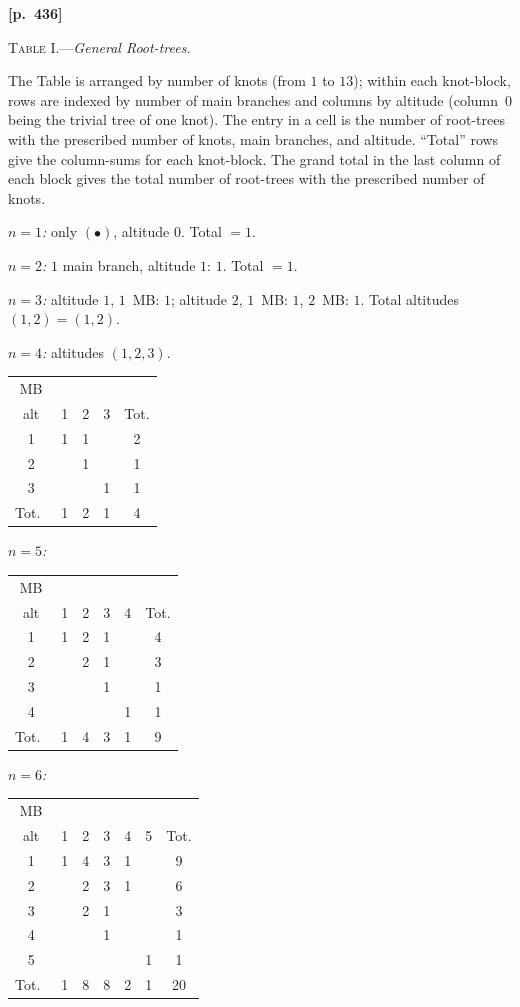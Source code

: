 \documentclass[11pt,a4paper]{article}
\begin{document}
\bigskip
\noindent\textbf{[p.~436]}\quad
\begin{center}
\textsc{Table I.}\quad---\quad\textit{General Root-trees.}
\end{center}

\noindent The Table is arranged by number of knots (from $1$ to $13$); within each knot-block, rows are indexed by number of main branches and columns by altitude (column~$0$ being the trivial tree of one knot). The entry in a cell is the number of root-trees with the prescribed number of knots, main branches, and altitude. ``Total'' rows give the column-sums for each knot-block. The grand total in the last column of each block gives the total number of root-trees with the prescribed number of knots.

\medskip

\noindent\textit{$n=1$:} only $(\bullet)$, altitude $0$. Total $=1$.

\smallskip
\noindent\textit{$n=2$:} $1$ main branch, altitude $1$: $1$. Total $=1$.

\smallskip
\noindent\textit{$n=3$:} altitude $1$, $1$~MB: $1$; altitude $2$, $1$~MB: $1$, $2$~MB: $1$. Total altitudes $(1,2)=(1,2)$.

\smallskip
\noindent\textit{$n=4$:} altitudes $(1,2,3)$.
\begin{center}
\begin{tabular}{c|ccc|c}
MB \\ alt & 1 & 2 & 3 & Tot.\\\hline
1 & 1 & 1 & & 2\\
2 & & 1 & & 1\\
3 & & & 1 & 1\\\hline
Tot.\ & 1 & 2 & 1 & 4
\end{tabular}
\end{center}

\noindent\textit{$n=5$:}
\begin{center}
\begin{tabular}{c|cccc|c}
MB \\ alt & 1 & 2 & 3 & 4 & Tot.\\\hline
1 & 1 & 2 & 1 & & 4\\
2 & & 2 & 1 & & 3\\
3 & & & 1 & & 1\\
4 & & & & 1 & 1\\\hline
Tot.\ & 1 & 4 & 3 & 1 & 9
\end{tabular}
\end{center}

\noindent\textit{$n=6$:}
\begin{center}
\begin{tabular}{c|ccccc|c}
MB \\ alt & 1 & 2 & 3 & 4 & 5 & Tot.\\\hline
1 & 1 & 4 & 3 & 1 & & 9\\
2 & & 2 & 3 & 1 & & 6\\
3 & & 2 & 1 & & & 3\\
4 & & & 1 & & & 1\\
5 & & & & & 1 & 1\\\hline
Tot.\ & 1 & 8 & 8 & 2 & 1 & 20
\end{tabular}
\end{center}
\end{document}
